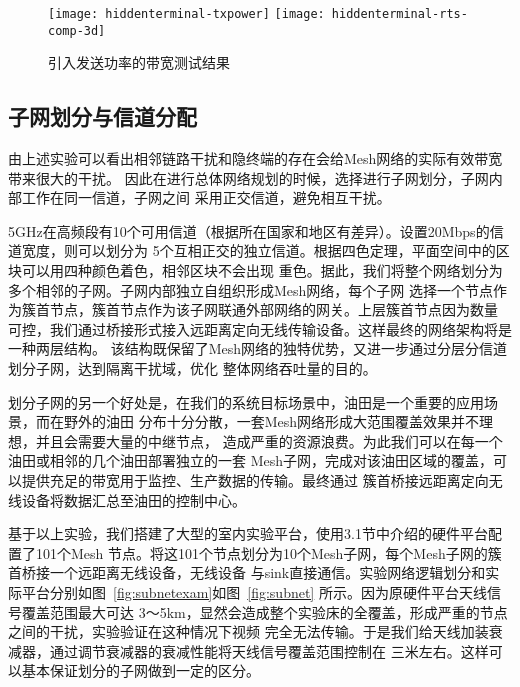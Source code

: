 \begin{figure}[h]
  \centering
      {\texttt{[image: hiddenterminal-txpower]}}
  \hspace{1em}
    {\texttt{[image: hiddenterminal-rts-comp-3d]}}
  \caption{引入发送功率的带宽测试结果}
\end{figure}

\subsection{子网划分与信道分配}
由上述实验可以看出相邻链路干扰和隐终端的存在会给Mesh网络的实际有效带宽带来很大的干扰。
因此在进行总体网络规划的时候，选择进行子网划分，子网内部工作在同一信道，子网之间
采用正交信道，避免相互干扰。

5GHz在高频段有10个可用信道（根据所在国家和地区有差异）。设置20Mbps的信道宽度，则可以划分为
5个互相正交的独立信道。根据四色定理，平面空间中的区块可以用四种颜色着色，相邻区块不会出现
重色。据此，我们将整个网络划分为多个相邻的子网。子网内部独立自组织形成Mesh网络，每个子网
选择一个节点作为簇首节点，簇首节点作为该子网联通外部网络的网关。上层簇首节点因为数量
可控，我们通过桥接形式接入远距离定向无线传输设备。这样最终的网络架构将是一种两层结构。
该结构既保留了Mesh网络的独特优势，又进一步通过分层分信道划分子网，达到隔离干扰域，优化
整体网络吞吐量的目的。

划分子网的另一个好处是，在我们的系统目标场景中，油田是一个重要的应用场景，而在野外的油田
分布十分分散，一套Mesh网络形成大范围覆盖效果并不理想，并且会需要大量的中继节点，
造成严重的资源浪费。为此我们可以在每一个油田或相邻的几个油田部署独立的一套
Mesh子网，完成对该油田区域的覆盖，可以提供充足的带宽用于监控、生产数据的传输。最终通过
簇首桥接远距离定向无线设备将数据汇总至油田的控制中心。

基于以上实验，我们搭建了大型的室内实验平台，使用3.1节中介绍的硬件平台配置了101个Mesh
节点。将这101个节点划分为10个Mesh子网，每个Mesh子网的簇首桥接一个远距离无线设备，无线设备
与sink直接通信。实验网络逻辑划分和实际平台分别如图~\ref{fig:subnetexam}如图~\ref{fig:subnet}
所示。因为原硬件平台天线信号覆盖范围最大可达
3～5km，显然会造成整个实验床的全覆盖，形成严重的节点之间的干扰，实验验证在这种情况下视频
完全无法传输。于是我们给天线加装衰减器，通过调节衰减器的衰减性能将天线信号覆盖范围控制在
三米左右。这样可以基本保证划分的子网做到一定的区分。

